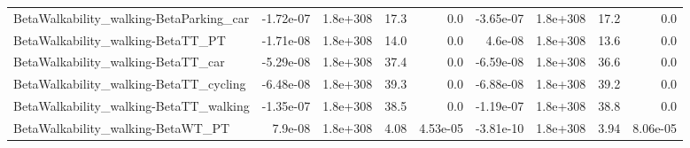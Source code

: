 \begin{tabular}{lrrrrrrrr}
BetaWalkability_walking-BetaParking_car & -1.72e-07 & 1.8e+308 & 17.3 & 0.0 & -3.65e-07 & 1.8e+308 & 17.2 & 0.0 \\
BetaWalkability_walking-BetaTT_PT & -1.71e-08 & 1.8e+308 & 14.0 & 0.0 & 4.6e-08 & 1.8e+308 & 13.6 & 0.0 \\
BetaWalkability_walking-BetaTT_car & -5.29e-08 & 1.8e+308 & 37.4 & 0.0 & -6.59e-08 & 1.8e+308 & 36.6 & 0.0 \\
BetaWalkability_walking-BetaTT_cycling & -6.48e-08 & 1.8e+308 & 39.3 & 0.0 & -6.88e-08 & 1.8e+308 & 39.2 & 0.0 \\
BetaWalkability_walking-BetaTT_walking & -1.35e-07 & 1.8e+308 & 38.5 & 0.0 & -1.19e-07 & 1.8e+308 & 38.8 & 0.0 \\
BetaWalkability_walking-BetaWT_PT & 7.9e-08 & 1.8e+308 & 4.08 & 4.53e-05 & -3.81e-10 & 1.8e+308 & 3.94 & 8.06e-05 \\
\end{tabular}

